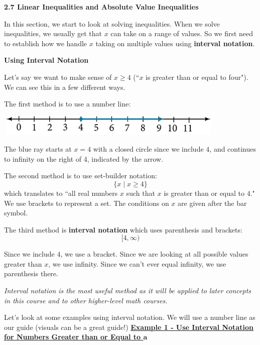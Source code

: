 \documentclass[12pt]{book}
\begin{document}
{\Large \textbf{2.7 Linear Inequalities and Absolute Value Inequalities}}

\vspace{3mm}

In this section, we start to look at solving inequalities. When we solve inequalities, we usually get that $x$ can take on a range of values. So we first need to establish how we handle $x$ taking on multiple values using \textbf{interval notation}.

\vspace{3mm}
{\large \textbf{Using Interval Notation}}
\vspace{3mm}

Let's say we want to make sense of $x \geq 4$ (``$x$ is greater than or equal to four"). We can see this in a few different ways. 

The first method is to use a number line:
\vspace{3mm}

\centerline{\includegraphics[height=10mm, width=110mm]{numberline.jpeg}}
The blue ray starts at $x=4$ with a closed circle since we include $4$, and continues to infinity on the right of 4, indicated by the arrow.
\vspace{3mm}

The second method is to use set-builder notation: $$\{x \mid x\geq 4 \}$$ which translates to ``all real numbers $x$ such that $x$ is greater than or equal to $4$." We use brackets to represent a set. The conditions on $x$ are given after the bar symbol. 
\vspace{3mm}

The third method is \textbf{interval notation} which uses parenthesis and brackets:  $$ [4, \infty)$$

Since we include $4$, we use a bracket. Since we are looking at all possible values greater than $x$, we use infinity. Since we can't ever equal infinity, we use parenthesis there. 

\emph{Interval notation is the most useful method as it will be applied to later concepts in this course and to other higher-level math courses.}

\vspace{3mm}
Let's look at some examples using interval notation. We will use a number line as our guide (visuals can be a great guide!) 
\newpage
\underline{\textbf{Example 1 - Use Interval Notation for Numbers Greater than or Equal to $\mathbf{a}$}}
\vspace{1mm}
\end{document}
